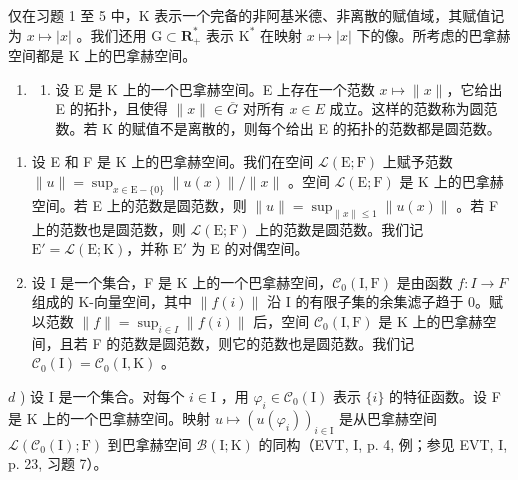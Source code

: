 \exercisesection{}

仅在习题 1 至 5 中，K 表示一个完备的非阿基米德、非离散的赋值域，其赋值记为 \(x \mapsto |x|\) 。我们还用 \(\mathrm{G} \subset \mathbf{R}_{+}^{*}\) 表示 \(\mathrm{K}^{*}\) 在映射 \(x \mapsto |x|\) 下的像。所考虑的巴拿赫空间都是 \(\mathrm{K}\) 上的巴拿赫空间。

\begin{enumerate}
\def\labelenumi{\arabic{enumi})}
\tightlist
\item
  \begin{enumerate}
  \def\labelenumii{\alph{enumii})}
  \tightlist
  \item
    设 E 是 K 上的一个巴拿赫空间。E 上存在一个范数 \(x \mapsto \|x\|\)，它给出 E 的拓扑，且使得 \(\|x\| \in \overline{G}\) 对所有 \(x \in E\) 成立。这样的范数称为圆范数。若 K 的赋值不是离散的，则每个给出 E 的拓扑的范数都是圆范数。
  \end{enumerate}
\end{enumerate}

\begin{enumerate}
\def\labelenumi{\alph{enumi})}
\setcounter{enumi}{1}
\item
  设 E 和 F 是 K 上的巴拿赫空间。我们在空间 \(\mathcal{L}(\mathrm{E};\mathrm{F})\) 上赋予范数 \(\| u\| = \sup_{x\in \mathrm{E}- \{0\}}\| u(x)\| /\| x\|\) 。空间 \(\mathcal{L}(\mathrm{E};\mathrm{F})\) 是 K 上的巴拿赫空间。若 E 上的范数是圆范数，则 \(\| u\| = \sup_{\| x\| \leqslant 1}\| u(x)\|\) 。若 F 上的范数也是圆范数，则 \(\mathcal{L}(\mathrm{E};\mathrm{F})\) 上的范数是圆范数。我们记 \(\mathrm{E}' = \mathcal{L}(\mathrm{E};\mathrm{K})\)，并称 \(\mathrm{E}'\) 为 E 的对偶空间。
\item
  设 I 是一个集合，F 是 K 上的一个巴拿赫空间，\(\mathcal{C}_{0}(\mathrm{I},\mathrm{F})\) 是由函数 \(f\colon I\to F\) 组成的 K-向量空间，其中 \(\|f(i)\|\) 沿 I 的有限子集的余集滤子趋于 0。赋以范数 \(\|f\|=\sup_{i\in I}\|f(i)\|\) 后，空间 \(\mathcal{C}_{0}(\mathrm{I},\mathrm{F})\) 是 K 上的巴拿赫空间，且若 F 的范数是圆范数，则它的范数也是圆范数。我们记 \(\mathcal{C}_{0}(\mathrm{I})=\mathcal{C}_{0}(\mathrm{I},\mathrm{K})\) 。
\end{enumerate}

\(d\) ) 设 I 是一个集合。对每个 \(i\in \mathrm{I}\) ，用 \(\varphi_{i}\in \mathcal{C}_{0}(\mathrm{I})\) 表示 \(\{i\}\) 的特征函数。设 F 是 K 上的一个巴拿赫空间。映射 \(u \mapsto (u(\varphi_i))_{i \in \mathrm{I}}\) 是从巴拿赫空间 \(\mathcal{L}(\mathcal{C}_0(\mathrm{I});\mathrm{F})\) 到巴拿赫空间 \(\mathcal{B}(\mathrm{I};\mathrm{K})\) 的同构（EVT, I, p. 4, 例；参见 EVT, I, p. 23, 习题 7）。

